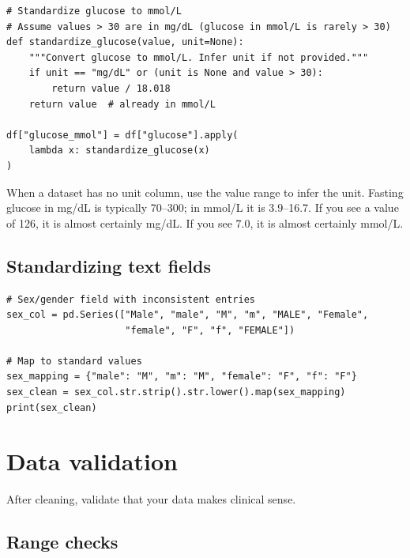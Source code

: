 \begin{verbatim}
# Standardize glucose to mmol/L
# Assume values > 30 are in mg/dL (glucose in mmol/L is rarely > 30)
def standardize_glucose(value, unit=None):
    """Convert glucose to mmol/L. Infer unit if not provided."""
    if unit == "mg/dL" or (unit is None and value > 30):
        return value / 18.018
    return value  # already in mmol/L

df["glucose_mmol"] = df["glucose"].apply(
    lambda x: standardize_glucose(x)
)
\end{verbatim}

\begin{pythontip}
When a dataset has no unit column, use the value range to infer the unit. Fasting glucose in mg/dL is typically 70--300; in mmol/L it is 3.9--16.7. If you see a value of 126, it is almost certainly mg/dL. If you see 7.0, it is almost certainly mmol/L.
\end{pythontip}

\subsection{Standardizing text fields}

\begin{verbatim}
# Sex/gender field with inconsistent entries
sex_col = pd.Series(["Male", "male", "M", "m", "MALE", "Female",
                     "female", "F", "f", "FEMALE"])

# Map to standard values
sex_mapping = {"male": "M", "m": "M", "female": "F", "f": "F"}
sex_clean = sex_col.str.strip().str.lower().map(sex_mapping)
print(sex_clean)
\end{verbatim}

\section{Data validation}

After cleaning, validate that your data makes clinical sense.

\subsection{Range checks}

